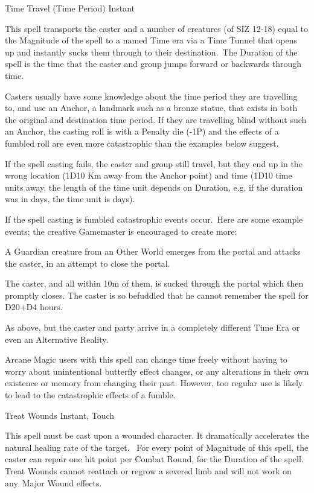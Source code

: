 \begin{rpg-spell}
{Time Travel (Time Period)}
{Instant}

This spell transports the caster and a number of creatures (of SIZ 12-18) equal to the Magnitude of the spell to a named Time era via a Time Tunnel that opens up and instantly sucks them through to their destination. The Duration of the spell is the time that the caster and group jumps forward or backwards through time. 

Casters usually have some knowledge about the time period they are travelling to, and use an Anchor, a landmark such as a bronze statue, that exists in both the original and destination time period. If they are travelling blind without such an Anchor, the casting roll is with a Penalty die (-1P) and the effects of a fumbled roll are even more catastrophic than the examples below suggest. 

If the spell casting fails, the caster and group still travel, but they end up in the wrong location (1D10 Km away from the Anchor point) and time (1D10 time units away, the length of the time unit depends on Duration, e.g. if the duration was in days, the time unit is days).

If the spell casting is fumbled catastrophic events occur. Here are some example events; the creative Gamemaster is encouraged to create more:
\begin{rpg-list}
\item A Guardian creature from an Other World emerges from the portal and attacks the caster, in an attempt to close the portal. 
\item The caster, and all within 10m of them, is sucked through the portal which then promptly closes. The caster is so befuddled that he cannot remember the spell for D20+D4 hours. 
\item As above, but the caster and party arrive in a completely different Time Era or even an Alternative Reality.
\end{rpg-list}

Arcane Magic users with this spell can change time freely without having to worry about unintentional butterfly effect changes, or any alterations in their own existence or memory from changing their past. However, too regular use is likely to lead to the catastrophic effects of a fumble.
\end{rpg-spell}


\begin{rpg-spell}
{Treat Wounds}
{Instant, Touch}

This spell must be cast upon a wounded character. It dramatically accelerates the natural healing rate of the target.  For every point of Magnitude of this spell, the caster can repair one hit point per Combat Round, for the Duration of the spell. Treat Wounds cannot reattach or regrow a severed limb and will not work on any Major Wound effects. 
\end{rpg-spell}


